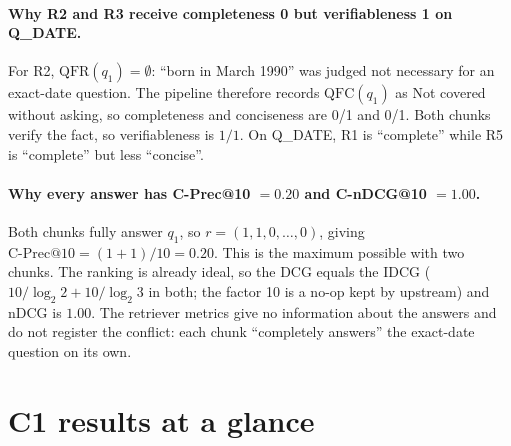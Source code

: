 \documentclass[11pt,a4paper]{article}
\begin{document}
\paragraph{Why R2 and R3 receive completeness 0 but verifiableness 1 on Q\_DATE.}
For R2, $\mathrm{QFR}(q_1)=\emptyset$: ``born in March 1990'' was judged not necessary for an exact-date question. The pipeline therefore records $\mathrm{QFC}(q_1)$ as Not covered without asking, so completeness and conciseness are 0/1 and 0/1. Both chunks verify the fact, so verifiableness is $1/1$. On Q\_DATE, R1 is ``complete'' while R5 is ``complete'' but less ``concise''.

\paragraph{Why every answer has C-Prec@10 $=0.20$ and C-nDCG@10 $=1.00$.}
Both chunks fully answer $q_1$, so $r=(1,1,0,\dots,0)$, giving $\text{C-Prec@10}=(1+1)/10=0.20$. This is the maximum possible with two chunks. The ranking is already ideal, so the DCG equals the IDCG ($10/\log_2 2 + 10/\log_2 3$ in both; the factor 10 is a no-op kept by upstream) and nDCG is $1.00$. The retriever metrics give no information about the answers and do not register the conflict: each chunk ``completely answers'' the exact-date question on its own.

\section{C1 results at a glance}
\label{sec:results}
\end{document}
